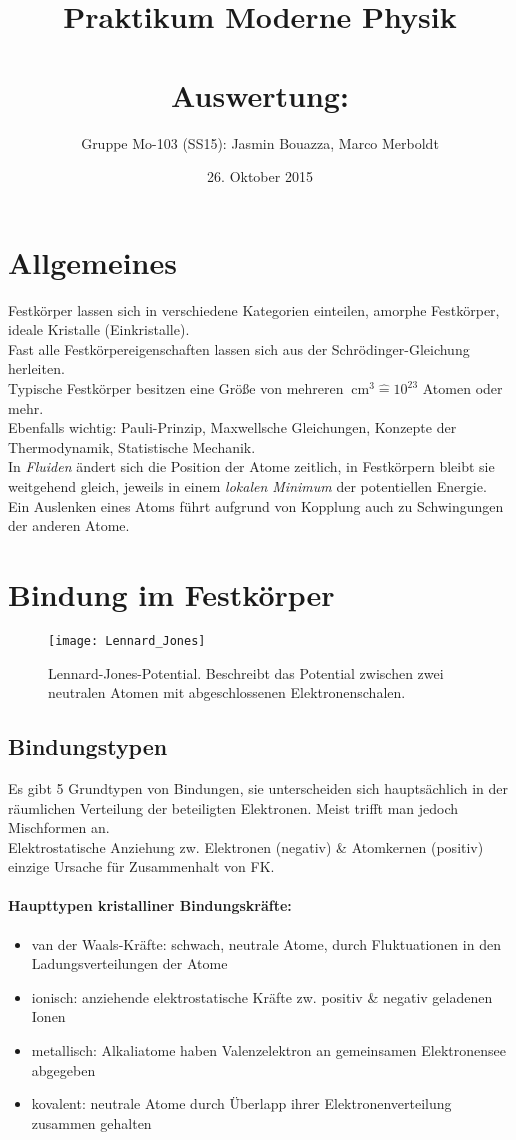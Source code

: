 \documentclass[a4paper,12pt]{article}
\title{\vspace{-2cm}
	Praktikum Moderne Physik\\
	~\\
	Auswertung:\\
	\textbf{\versuchname}
}
\author{
	Gruppe Mo-103 (SS15): Jasmin Bouazza, Marco Merboldt\\
}
\date{26. Oktober 2015}
\begin{document}
\maketitle
\vspace{.5cm}
\setcounter{page}{0}
\thispagestyle{empty}
\newpage

\tableofcontents
\section{Allgemeines}
Festkörper lassen sich in verschiedene Kategorien einteilen, amorphe Festkörper, ideale Kristalle (Einkristalle).\\
Fast alle Festkörpereigenschaften lassen sich aus der Schrödinger-Gleichung herleiten.\\
Typische Festkörper besitzen eine Größe von mehreren $ \SI{}{\centi\meter^3} \hat{=} 10^{23}$ Atomen oder mehr.\\
Ebenfalls wichtig: Pauli-Prinzip, Maxwellsche Gleichungen, Konzepte der Thermodynamik, Statistische Mechanik.\\
In \emph{Fluiden} ändert sich die Position der Atome zeitlich, in Festkörpern bleibt sie weitgehend gleich, jeweils in einem \emph{lokalen Minimum} der potentiellen Energie. Ein Auslenken eines Atoms führt aufgrund von Kopplung auch zu Schwingungen der anderen Atome. 
\section{Bindung im Festkörper}
\begin{figure}[tb]
\centering
\texttt{[image: Lennard\_Jones]}
\caption{Lennard-Jones-Potential. Beschreibt das Potential zwischen zwei neutralen Atomen mit abgeschlossenen Elektronenschalen.}
\label{fig:Lennard_Jones}
\end{figure}
\subsection{Bindungstypen}
Es gibt 5 Grundtypen von Bindungen, sie unterscheiden sich hauptsächlich in der räumlichen Verteilung der beteiligten Elektronen. Meist trifft man jedoch Mischformen an.\\
Elektrostatische Anziehung zw. Elektronen (negativ) \& Atomkernen (positiv) einzige Ursache für Zusammenhalt von FK.
\paragraph*{Haupttypen kristalliner Bindungskräfte:}
\begin{itemize}
	\item van der Waals-Kräfte: schwach, neutrale Atome, durch Fluktuationen in den Ladungsverteilungen der Atome
	\item ionisch: anziehende elektrostatische Kräfte zw. positiv \& negativ geladenen Ionen
	\item metallisch: Alkaliatome haben Valenzelektron an gemeinsamen Elektronensee abgegeben
	\item kovalent: neutrale Atome durch Überlapp ihrer Elektronenverteilung zusammen gehalten
	\end{itemize}
\end{document}
